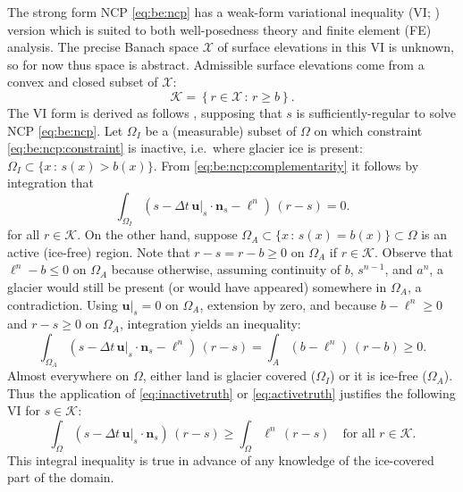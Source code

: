 \documentclass[hidelinks,onefignum,onetabnum,final]{siamart220329}  %
\newcommand{\bn}{\mathbf{n}}
\newcommand{\bu}{\mathbf{u}}
\newcommand{\cK}{\mathcal{K}}
\newcommand{\cX}{\mathcal{X}}
\begin{document}
The strong form NCP \eqref{eq:be:ncp} has a weak-form variational inequality (VI; \cite{Evans2010,KinderlehrerStampacchia1980}) version which is suited to both well-posedness theory and finite element (FE) analysis.  The precise Banach space $\cX$ of surface elevations in this VI is unknown, so for now thus space is abstract.  Admissible surface elevations come from a convex and closed subset of $\cX$:
\begin{equation}
\cK = \left\{r \in\cX\,:\,r \ge b\right\}.  \label{eq:be:admissible}
\end{equation}
The VI form is derived as follows \cite{Bueler2021conservation}, supposing that $s$ is sufficiently-regular to solve NCP \eqref{eq:be:ncp}.  Let $\Omega_I$ be a (measurable) subset of $\Omega$ on which constraint \eqref{eq:be:ncp:constraint} is inactive, i.e.~where glacier ice is present: $\Omega_I \subset \{x\,:\,s(x)>b(x)\}$.  From \eqref{eq:be:ncp:complementarity} it follows by integration that
\begin{equation}
\int_{\Omega_I} \left(s - \Delta t\,\bu|_s \cdot \bn_s - \ell^n\right)\,(r-s) = 0.  \label{eq:inactivetruth}
\end{equation}
for all $r\in\cK$.  On the other hand, suppose $\Omega_A \subset \{x\,:\,s(x)=b(x)\} \subset \Omega$ is an active (ice-free) region.  Note that $r-s=r-b\ge 0$ on $\Omega_A$ if $r\in\cK$.  Observe that $\ell^n - b \le 0$ on $\Omega_A$ because otherwise, assuming continuity of $b$, $s^{n-1}$, and $a^n$, a glacier would still be present (or would have appeared) somewhere in $\Omega_A$, a contradiction.  Using $\bu|_s=0$ on $\Omega_A$, extension by zero, and because $b-\ell^n \ge 0$ and $r-s\ge 0$ on $\Omega_A$, integration yields an inequality:
\begin{equation}
\int_{\Omega_A} \left(s - \Delta t\,\bu|_s \cdot \bn_s - \ell^n\right)\,(r-s) = \int_A \left(b - \ell^n\right)\,(r-b) \ge 0.  \label{eq:activetruth}
\end{equation}
Almost everywhere on $\Omega$, either land is glacier covered ($\Omega_I$) or it is ice-free ($\Omega_A$).  Thus the application of \eqref{eq:inactivetruth} or \eqref{eq:activetruth} justifies the following VI for $s \in \cK$:
\begin{equation}
\int_\Omega \left(s - \Delta t\,\bu|_s \cdot \bn_s\right)\,(r-s) \ge \int_\Omega \ell^n \,(r-s) \quad \text{for all } r \in \cK. \label{eq:be:viearly}
\end{equation}
This integral inequality is true in advance of any knowledge of the ice-covered part of the domain.
	
\end{document}
